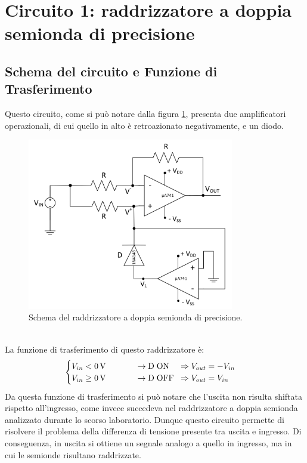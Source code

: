 \documentclass{report}
\begin{document}
\section{Circuito 1: raddrizzatore a doppia semionda di precisione}
\subsection{Schema del circuito e Funzione di Trasferimento}
Questo circuito, come si può notare dalla figura \ref{figura:schema1}, presenta due amplificatori operazionali, di cui quello in alto è retroazionato negativamente, e un diodo.
\begin{figure}[h]
	\centering
	\includegraphics[height=7.5cm]{immagini/schema1}
	\caption{Schema del raddrizzatore a doppia semionda di precisione.}
	\label{figura:schema1}
\end{figure}
\\ \noindent La funzione di trasferimento di questo raddrizzatore è:
\begin{equation}
   \begin{cases}
   V_{in}< \SI{0}{\volt}\;\;\indent\indent\rightarrow \mathrm{D\;ON}\;\;\;\; \Rightarrow V_{out} = -V_{in}\\
   V_{in}\ge \SI{0}{\volt}\;\;\indent\indent\rightarrow \mathrm{D\; OFF}\;\; \Rightarrow V_{out} = V_{in}
   \end{cases}
\end{equation}
Da questa funzione di trasferimento si può notare che l'uscita non risulta shiftata rispetto all'ingresso, come invece succedeva nel raddrizzatore a doppia semionda analizzato durante lo scorso laboratorio. Dunque questo circuito permette di risolvere il problema della differenza di tensione presente tra uscita e ingresso. Di conseguenza, in uscita si ottiene un segnale analogo a quello in ingresso, ma in cui le semionde risultano raddrizzate.
\end{document}
